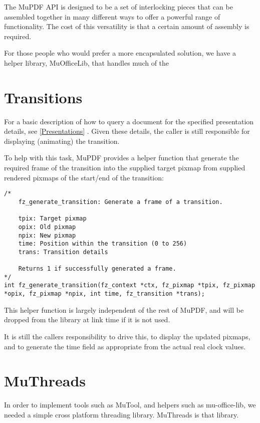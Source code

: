 \documentclass[oneside]{book}
\newcommand{\rjwref}[1] {\autoref{#1} \nameref{#1}}
\begin{document}
The MuPDF API is designed to be a set of interlocking pieces that can be assembled together in many different ways to offer a powerful range of functionality. The cost of this versatility is that a certain amount of assembly is required.

For those people who would prefer a more encapsulated solution, we have a helper library, MuOfficeLib, that handles much of the 

\chapter{Transitions}
\label{Transitions}

For a basic description of how to query a document for the specified presentation details, see \rjwref{Presentations}. Given these details, the caller is still responsible for displaying (animating) the transition.

To help with this task, MuPDF provides a helper function that generate the required frame of the transition into the supplied target pixmap from supplied rendered pixmaps of the start/end of the transition:

\begin{lstlisting}
/*
	fz_generate_transition: Generate a frame of a transition.

	tpix: Target pixmap
	opix: Old pixmap
	npix: New pixmap
	time: Position within the transition (0 to 256)
	trans: Transition details

	Returns 1 if successfully generated a frame.
*/
int fz_generate_transition(fz_context *ctx, fz_pixmap *tpix, fz_pixmap *opix, fz_pixmap *npix, int time, fz_transition *trans);
\end{lstlisting}

This helper function is largely independent of the rest of MuPDF, and will be dropped from the library at link time if it is not used.

It is still the callers responsibility to drive this, to display the updated pixmaps, and to generate the time field as appropriate from the actual real clock values.

\chapter{MuThreads}

In order to implement tools such as MuTool, and helpers such as mu-office-lib, we needed a simple cross platform threading library. MuThreads is that library.
\end{document}
